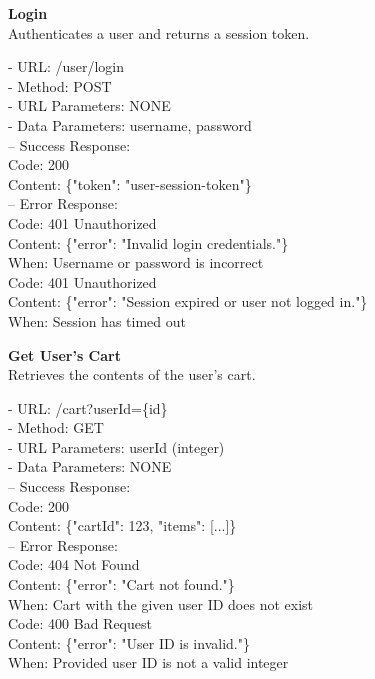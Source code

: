 \begin{flushleft}
    \textbf{Login} \\
    Authenticates a user and returns a session token.

    - URL: /user/login \\
    - Method: POST \\
    - URL Parameters: NONE \\
    - Data Parameters: username, password \\
    – Success Response: \\
    Code: 200 \\
    Content: \{"token": "user-session-token"\} \\
    – Error Response: \\
    Code: 401 Unauthorized \\
    Content: \{"error": "Invalid login credentials."\} \\
    When: Username or password is incorrect \\
    Code: 401 Unauthorized \\
    Content: \{"error": "Session expired or user not logged in."\} \\
    When: Session has timed out
\end{flushleft}

\begin{flushleft}
    \textbf{Get User's Cart} \\
    Retrieves the contents of the user's cart.

    - URL: /cart?userId=\{id\} \\
    - Method: GET \\
    - URL Parameters: userId (integer) \\
    - Data Parameters: NONE \\
    – Success Response: \\
    Code: 200 \\
    Content: \{"cartId": 123, "items": [...]\} \\
    – Error Response: \\
    Code: 404 Not Found \\
    Content: \{"error": "Cart not found."\} \\
    When: Cart with the given user ID does not exist \\
    Code: 400 Bad Request \\
    Content: \{"error": "User ID is invalid."\} \\
    When: Provided user ID is not a valid integer
\end{flushleft}

